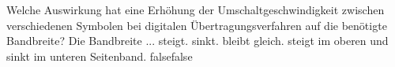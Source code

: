     {Welche Auswirkung hat eine Erhöhung der Umschaltgeschwindigkeit zwischen verschiedenen Symbolen bei digitalen Übertragungsverfahren auf die benötigte Bandbreite? Die Bandbreite ...}
    {steigt.}
    {sinkt.}
    {bleibt gleich.}
    {steigt im oberen und sinkt im unteren Seitenband.}
    {false}{false}
